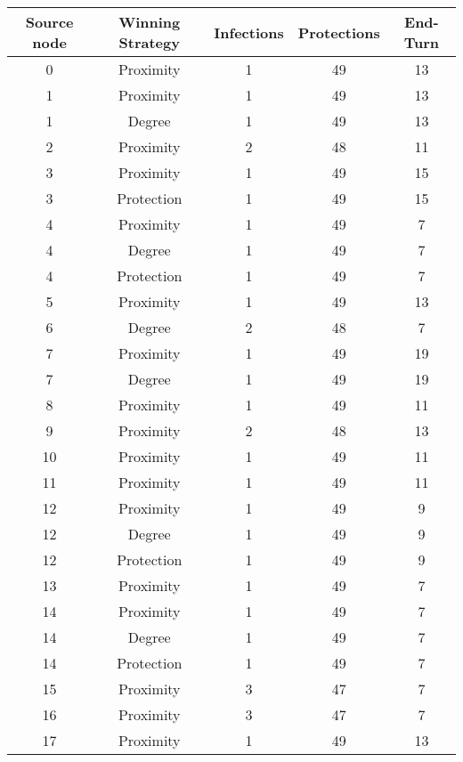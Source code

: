 \documentclass[results.tex]{subfiles}
\begin{document}
\begin{center}
  \begin{tabular}{| c || c | c | c | c |}
    \hline
    {\bfseries Source node} & {\bfseries Winning Strategy} & {\bfseries Infections} & {\bfseries Protections} & {\bfseries End-Turn} \\  %
    \hline\hline
    0 & Proximity & 1 & 49 & 13 \\ 
    \hline
    1 & Proximity & 1 & 49 & 13 \\ 
    \hline
    1 & Degree & 1 & 49 & 13 \\ 
    \hline
    2 & Proximity & 2 & 48 & 11 \\ 
    \hline
    3 & Proximity & 1 & 49 & 15 \\ 
    \hline
    3 & Protection & 1 & 49 & 15 \\ 
    \hline
    4 & Proximity & 1 & 49 & 7 \\ 
    \hline
    4 & Degree & 1 & 49 & 7 \\ 
    \hline
    4 & Protection & 1 & 49 & 7 \\ 
    \hline
    5 & Proximity & 1 & 49 & 13 \\ 
    \hline
    6 & Degree & 2 & 48 & 7 \\ 
    \hline
    7 & Proximity & 1 & 49 & 19 \\ 
    \hline
    7 & Degree & 1 & 49 & 19 \\ 
    \hline
    8 & Proximity & 1 & 49 & 11 \\ 
    \hline
    9 & Proximity & 2 & 48 & 13 \\ 
    \hline
    10 & Proximity & 1 & 49 & 11 \\ 
    \hline
    11 & Proximity & 1 & 49 & 11 \\ 
    \hline
    12 & Proximity & 1 & 49 & 9 \\ 
    \hline
    12 & Degree & 1 & 49 & 9 \\ 
    \hline
    12 & Protection & 1 & 49 & 9 \\ 
    \hline
    13 & Proximity & 1 & 49 & 7 \\ 
    \hline
    14 & Proximity & 1 & 49 & 7 \\ 
    \hline
    14 & Degree & 1 & 49 & 7 \\ 
    \hline
    14 & Protection & 1 & 49 & 7 \\ 
    \hline
    15 & Proximity & 3 & 47 & 7 \\ 
    \hline
    16 & Proximity & 3 & 47 & 7 \\ 
    \hline
    17 & Proximity & 1 & 49 & 13 \\ 

\end{tabular}
\end{center}
\end{document}

